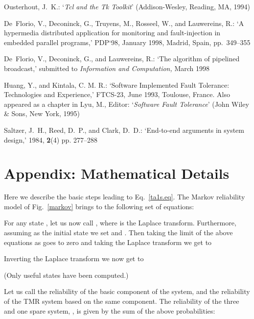 \documentclass[11pt]{article}
\begin{document}
\begin{thebibliography}{20}
{\sc Ousterhout, J.~K.}:
\newblock `{\em Tcl and the Tk Toolkit}'
\newblock (Addison-Wesley, Reading, MA, 1994)

{\sc De~Florio, V., Deconinck, G., Truyens, M., Rosseel, W., and Lauwereins,
  R.}:
\newblock `A hypermedia distributed application for monitoring and
  fault-injection in embedded parallel programs,'
 PDP`98, January 1998, Madrid, Spain, pp.~349--355

{\sc De~Florio, V., Deconinck, G., and Lauwereins, R.}:
\newblock `The algorithm of pipelined broadcast,'
\newblock submitted to {\em Information and Computation,} March 1998

{\sc Huang, Y., and Kintala, C. M. R.}:
\newblock `Software Implemented Fault Tolerance:
Technologies and Experience,'
 FTCS-23, June 1993, Toulouse, France. Also
appeared as a chapter in {\sc Lyu, M.}, Editor: `\emph{Software Fault Tolerance}'
(John Wiley \& Sons, New York, 1995)

{\sc Saltzer, J.~H., Reed, D.~P., and Clark, D.~D.}:
\newblock `End-to-end arguments in system design,'
 1984, {\bf 2}(4) pp. 277--288
\end{thebibliography}

\vfill\eject

\appendix
\section{Appendix: Mathematical Details}\label{a}
Here we describe the basic steps leading to Eq.~\ref{ta1s.eq}.
The Markov reliability model of Fig.~\ref{markov} brings to the following set of equations:


For any state , let us now call , where  is the Laplace transform.
Furthermore, assuming  as the initial state we set  and
. Then 
taking the limit of the above equations as  goes to zero and taking the Laplace transform
we get to






Inverting the Laplace transform we now get to


\noindent
(Only useful states have been computed.)

Let us call  the reliability of the basic component of the system, and
 the reliability of the TMR system based on the same component.
The reliability of the three and one spare system, , is given by the sum of the above
probabilities:
\end{document}
